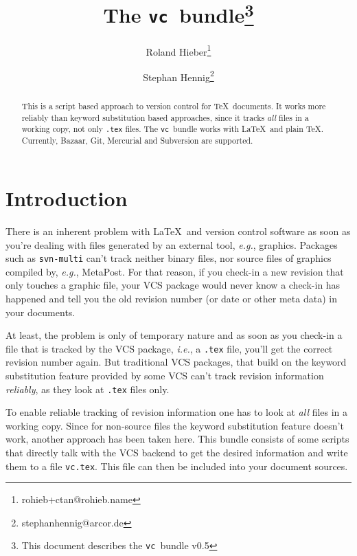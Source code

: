\documentclass[11pt]{article}
\newcommand*{\pkg}{\texttt{vc}}
\newcommand*{\pkgversion}{v0.5}
\begin{document}
\author{Roland Hieber\thanks{rohieb+ctan@rohieb.name} \and
    Stephan Hennig\thanks{stephanhennig@arcor.de}}
\title{The \pkg\ bundle\thanks{This document describes the \pkg\ bundle
    \pkgversion}}
\maketitle
\begin{abstract}
  This is a script based approach to version control for \TeX\
  documents.  It works more reliably than keyword substitution based
  approaches, since it tracks \emph{all} files in a working copy, not
  only \texttt{.tex} files.  The \pkg\ bundle works with \LaTeX\ and
  plain \TeX.  Currently, Bazaar, Git, Mercurial and Subversion are supported.
\end{abstract}
\begin{multicols}{2}
\tableofcontents
\end{multicols}



\section{Introduction}
There is an inherent problem with \LaTeX\ and version control software
as soon as you're dealing with files generated by an external tool,
\emph{e.g.}, graphics.  Packages such as \texttt{svn-multi} can't track
neither binary files, nor source files of graphics compiled by,
\emph{e.g.}, MetaPost.  For that reason, if you check-in a new revision
that only touches a graphic file, your VCS package would never know a
check-in has happened and tell you the old revision number (or date or
other meta data) in your documents.

At least, the problem is only of temporary nature and as soon as you
check-in a file that is tracked by the VCS package, \emph{i.e.}, a
\texttt{.tex} file, you'll get the correct revision number again.  But
traditional VCS packages, that build on the keyword substitution feature
provided by some VCS can't track revision information \emph{reliably},
as they look at \texttt{.tex} files only.

To enable reliable tracking of revision information one has to look at
\emph{all} files in a working copy.  Since for non-source files the
keyword substitution feature doesn't work, another approach has been
taken here.  This bundle consists of some scripts that directly talk
with the VCS backend to get the desired information and write them to a
file \texttt{vc.tex}.  This file can then be included into your document
sources.
\end{document}
